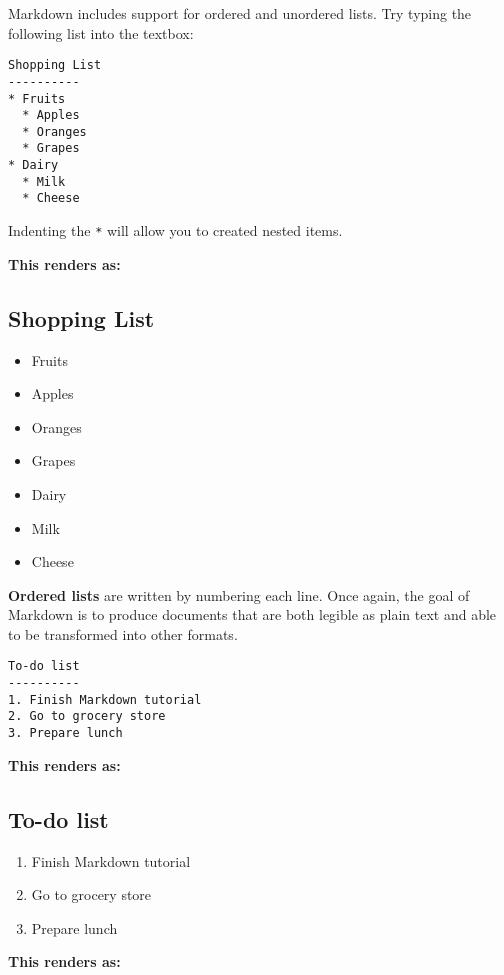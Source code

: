 \documentclass{article}
\providecommand{\tightlist}{%
      \setlength{\itemsep}{0pt}\setlength{\parskip}{0pt}}
\begin{document}
    Markdown includes support for ordered and unordered lists. Try typing
the following list into the textbox:

\begin{verbatim}
Shopping List
----------
* Fruits
  * Apples
  * Oranges
  * Grapes
* Dairy
  * Milk
  * Cheese
\end{verbatim}

Indenting the \texttt{*} will allow you to created nested items.

    \textbf{This renders as:}

\subsection{Shopping List}\label{shopping-list}

\begin{itemize}
\tightlist
\item
  Fruits
\item
  Apples
\item
  Oranges
\item
  Grapes
\item
  Dairy
\item
  Milk
\item
  Cheese
\end{itemize}

    \textbf{Ordered lists} are written by numbering each line. Once again,
the goal of Markdown is to produce documents that are both legible as
plain text and able to be transformed into other formats.

\begin{verbatim}
To-do list
----------
1. Finish Markdown tutorial
2. Go to grocery store
3. Prepare lunch
\end{verbatim}

    \textbf{This renders as:}

\subsection{To-do list}\label{to-do-list}

\begin{enumerate}
\def\labelenumi{\arabic{enumi}.}
\tightlist
\item
  Finish Markdown tutorial
\item
  Go to grocery store
\item
  Prepare lunch
\end{enumerate}

    \textbf{This renders as:}
\end{document}
